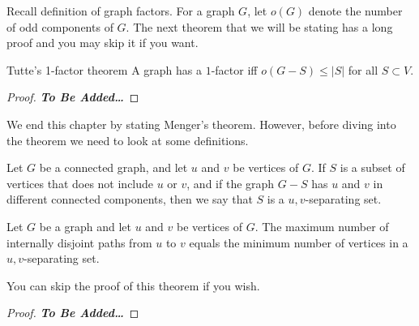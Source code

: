 \documentclass[../basic_graph_theory.tex]{subfiles}
\begin{document}
Recall definition of graph factors.  For a graph $G$, let $o(G)$ denote the number of odd components of $G$. The next theorem that we will be stating has a long proof and you may skip it if you want.

\begin{Thm}{Tutte's 1-factor theorem}{}
    A graph has a $1$-factor iff $o(G-S) \leq |S|$ for all $S \subset V$.
\end{Thm}
\begin{proof}
    \textbf{\textit{To Be Added\dots}}
\end{proof}
We end this chapter by stating Menger's theorem. However, before diving into the theorem we need to look at some definitions.

\ssk

Let $G$ be a connected graph, and let $u$ and $v$ be vertices of $G$. If $S$ is a subset of vertices that does not include $u$ or $v$, and if the graph $G-S$ has $u$ and $v$ in different connected components, then we say that $S$ is a $u,v$-separating set.

\begin{Thm}{}{}
    Let $G$ be a graph and let $u$ and $v$ be vertices of $G$. The maximum number of internally disjoint paths from $u$ to $v$ equals the minimum number of vertices in a $u,v$-separating set.
\end{Thm}
You can skip the proof of this theorem if you wish.
\begin{proof}
    \textbf{\textit{To Be Added\dots}}
\end{proof}
\end{document}

